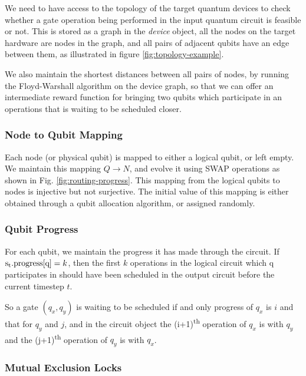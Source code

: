 \documentclass[%
 reprint,
 amsmath,amssymb,
 aps,
]{revtex4-2}
\begin{document}
We need to have access to the topology of the target quantum devices to check whether a gate operation being performed in the input quantum circuit is feasible or not. This is stored as a graph in the \textit{device} object, all the nodes on the target hardware are nodes in the graph, and all pairs of adjacent qubits have an edge between them, as illustrated in figure \ref{fig:topology-example}.

We also maintain the shortest distances between all pairs of nodes, by running the Floyd-Warshall algorithm on the device graph, so that we can offer an intermediate reward function for bringing two qubits which participate in an operations that is waiting to be scheduled closer. 

\subsubsection{\label{sec:method-state-map}Node to Qubit Mapping}

Each node (or physical qubit) is mapped to either a logical qubit, or left empty. We maintain this mapping $Q \rightarrow N$, and evolve it using SWAP operations as shown in Fig. \ref{fig:routing-progress}. 
This mapping from the logical qubits to nodes is injective but not surjective.
The initial value of this mapping is either obtained through a qubit allocation algorithm, or assigned randomly.

\subsubsection{\label{sec:method-state-progress}Qubit Progress}

For each qubit, we maintain the progress it has made through the circuit. If $\textrm{s\textsubscript{t}.progress[q]} = k$, then the first $k$ operations in the logical circuit which $\textrm{q}$ participates in should have been scheduled in the output circuit before the current timestep $t$.

\label{para:method-state-circuit-gatecond}So a gate $(q_x, q_y)$ is waiting to be scheduled if and only progress of $q_x$ is $i$ and that for $q_y$ and $j$, and in the circuit object the (i+1)\textsuperscript{th} operation of $q_x$ is with $q_y$ and the (j+1)\textsuperscript{th} operation of $q_y$ is with $q_x$.


\subsubsection{\label{sec:method-state-mutex}Mutual Exclusion Locks}
\end{document}
